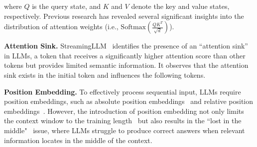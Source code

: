 where $Q$ is the query state, and $K$ and $V$ denote the key and value states, respectively. Previous research has revealed several significant insights into the distribution of attention weights (i.e., $\mathrm{Softmax}(\frac{QK^T}{\sqrt{d}})$).

\textbf{Attention Sink.} StreamingLLM~\citep{xiao2023efficient} identifies the presence of an ``attention sink'' in LLMs, a token that receives a significantly higher attention score than other tokens but provides limited semantic information. It observes that the attention sink exists in the initial token and influences the following tokens.

\textbf{Position Embedding.} To effectively process sequential input, LLMs require position embeddings, such as absolute position embeddings~\citep{vaswani2017attention, devlin2018bert} and relative position embeddings~\citep{su2024roformer, press2021train}. However, the introduction of position embedding not only limits the context window to the training length~\citep{chen2023extending} but also results in the ``lost in the middle"~\citep{liu2024lost} issue, where LLMs struggle to produce correct answers when relevant information locates in the middle of the context.

